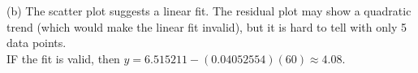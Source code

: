 \documentclass[bigtut]{tutorial}\usepackage[]{graphicx}\usepackage[]{color}
\newenvironment{knitrout}{}{} %
\begin{document}
\begin{tutorial}
\begin{questions}
\begin{solution}
\begin{knitrout}
\end{knitrout}
 
(b) 
The scatter plot suggests a linear fit. The residual plot may show a quadratic trend (which would  make the linear fit invalid), but it is hard to tell with only 5 data points. \\

IF the fit is valid, then
$\hat{y} = 6.515211 - (0.04052554)(60) \approx 4.08$.

\end{solution}
            
\end{questions}
\end{tutorial}
\end{document}
